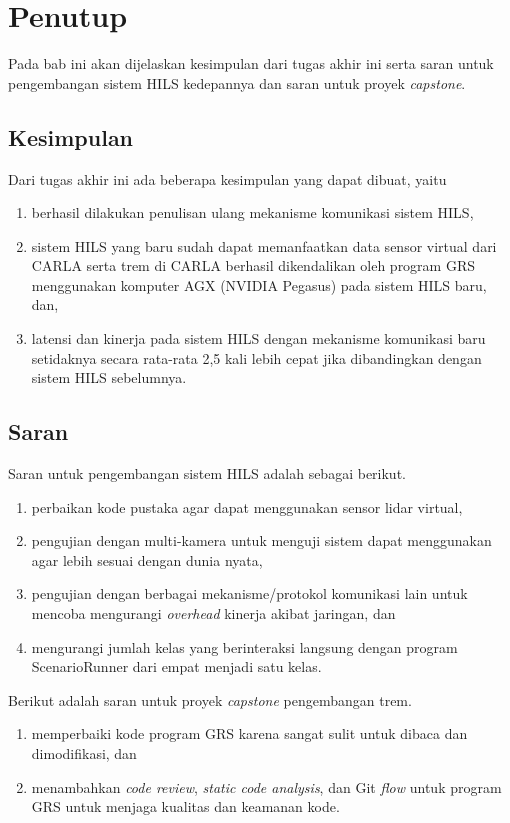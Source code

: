 \chapter{Penutup}\label{chapter-5}

Pada bab ini akan dijelaskan kesimpulan dari tugas akhir ini serta saran untuk
pengembangan sistem HILS kedepannya dan saran untuk proyek \textit{capstone}.

\section{Kesimpulan}

Dari tugas akhir ini ada beberapa kesimpulan yang dapat dibuat, yaitu
\begin{enumerate}
	\item berhasil dilakukan penulisan ulang mekanisme komunikasi sistem HILS,
	\item sistem HILS yang baru sudah dapat memanfaatkan data sensor virtual
	      dari CARLA serta trem di CARLA berhasil dikendalikan oleh program GRS
	      menggunakan komputer AGX (NVIDIA Pegasus) pada sistem HILS baru, dan,
	\item latensi dan kinerja pada sistem HILS dengan mekanisme komunikasi baru
	      setidaknya secara rata-rata 2,5 kali lebih cepat jika dibandingkan
	      dengan sistem HILS sebelumnya.
\end{enumerate}

\section{Saran}

Saran untuk pengembangan sistem HILS adalah sebagai berikut.
\begin{enumerate}
	\item perbaikan kode pustaka agar dapat menggunakan sensor lidar virtual,
	\item pengujian dengan multi-kamera untuk menguji sistem dapat menggunakan
	      agar lebih sesuai dengan dunia nyata,
	\item pengujian dengan berbagai mekanisme/protokol komunikasi lain untuk
	      mencoba mengurangi \textit{overhead} kinerja akibat jaringan, dan
	\item mengurangi jumlah kelas yang berinteraksi langsung dengan program
	      ScenarioRunner dari empat menjadi satu kelas.
\end{enumerate}

Berikut adalah saran untuk proyek \textit{capstone} pengembangan trem.
\begin{enumerate}
	\item memperbaiki kode program GRS karena sangat sulit untuk dibaca dan
	      dimodifikasi, dan
	\item menambahkan \textit{code review}, \textit{static code analysis}, dan
	      Git \textit{flow} untuk program GRS untuk menjaga kualitas dan keamanan
	      kode.
\end{enumerate}

